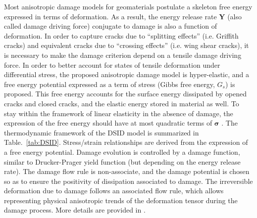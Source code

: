 \documentclass[preprint,review,12pt]{elsarticle}
\begin{document}
Most anisotropic damage models for geomaterials postulate a skeleton free energy expressed in terms of deformation. As a result, the energy release rate \textbf{Y} (also called damage driving force) conjugate to damage  is also a function of deformation. In order to capture cracks due to ``splitting effects'' (i.e. Griffith cracks) and equivalent cracks due to ``crossing effects'' (i.e. wing shear cracks), it is necessary to make the damage criterion depend on a tensile damage driving force. In order to better account for states of tensile deformation under differential stress, the proposed anisotropic damage model is hyper-elastic, and a free energy potential expressed as a term of stress (Gibbs free energy, $G_s$) is proposed. This free energy accounts for the surface energy dissipated by opened cracks and closed cracks, and the elastic energy stored in material as well. To stay within the framework of linear elasticity in the absence of damage, the expression of the free energy should have at most quadratic terms of $\bm\sigma$ \cite{Halm1998, Shao2005}
. The thermodynamic framework of the DSID model is summarized in Table.~\ref{tab:DSID}. Stress/strain relationships are derived from the expression of a free energy potential. Damage evolution is controlled by a damage function, similar to Drucker-Prager yield function (but depending on the energy release rate). The damage flow rule is non-associate, and the damage potential is chosen so as to ensure the positivity of dissipation associated to damage. The irreversible deformation due to damage follows an associated flow rule, which allows representing physical anisotropic trends of the deformation tensor during the damage process. More details are provided in \cite{Xu2014}.
\
\end{document}
